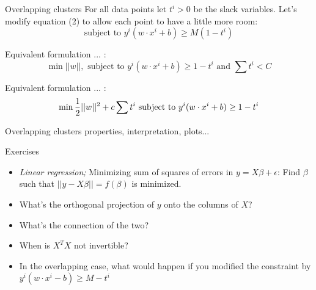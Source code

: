 \documentclass{beamer}
\begin{document}

\begin{frame}{Overlapping clusters}
    For all data points let $t^i > 0 $ be the slack variables. Let's modify equation (2) to allow each point to have a little more room:
    \[
    \text{subject to } y^i(w\cdot x^i + b)\geq M(1 - t^i) 
    \]
    
    Equivalent formulation ... :
    \[
    \min ||w||, \text{ subject to } y^i(w\cdot x^i + b)\geq 1 - t^i \text{ and } \sum t^i < C
    \]
    
    Equivalent formulation ... :
    \[
    \min \frac{1}{2}||w||^2 + c\sum t^i \\ 
    \text{ subject to } y^i(w\cdot x^i + b)\geq 1 - t^i
    \]
\end{frame}


\begin{frame}{Overlapping clusters}
properties, interpretation, plots...    
\end{frame}


\begin{frame}{Exercises}
\begin{itemize}
    \item \textit{Linear regression;} Minimizing sum of squares of errors in $y=X\beta + \epsilon$:  Find $\beta$ such that $||y-X\beta||=f(\beta)$ is minimized. 
    \item What's the orthogonal projection of $y$ onto the columns of $X$?
    \item What's the connection of the two?
    \item When is $X^TX$ not invertible?
    \item In the overlapping case, what would happen if you modified the constraint by $y^i(w\cdot x^i - b) \geq M - t^i$
\end{itemize}
\end{frame}

\end{document}
